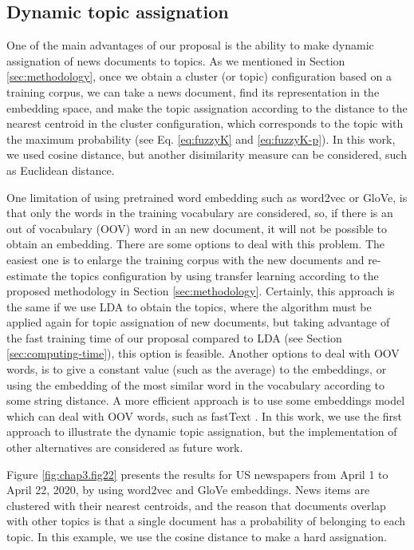 \documentclass{article}
\begin{document}
\subsection{Dynamic topic assignation} 

One of the main advantages of our proposal is the ability to make dynamic assignation of news documents to topics. As we mentioned in Section \ref{sec:methodology}, once we obtain a cluster (or topic) configuration based on a training corpus, we can take a news document, find its representation in the embedding space, and make the topic assignation according to the distance to the nearest centroid in the cluster configuration, which corresponds to the topic with the maximum probability (see Eq. \ref{eq:fuzzyK} and \ref{eq:fuzzyK-p}). In this work, we used cosine distance, but another disimilarity measure can be considered, such as Euclidean distance. 

One limitation of using pretrained word embedding such as word2vec or GloVe, is that only the words in the training vocabulary are considered, so, if there is an out of vocabulary (OOV) word in an new document, it will not be possible to obtain an embedding. There are some options to deal with this problem. The easiest one is to enlarge the training corpus with the new documents and re-estimate the topics configuration by using transfer learning according to the proposed methodology in Section \ref{sec:methodology}. Certainly, this approach is the same if we use LDA to obtain the topics, where the algorithm must be applied again for topic assignation of new documents, but taking advantage of the fast training time of our proposal compared to LDA (see Section \ref{sec:computing-time}), this option is feasible. Another options to deal with OOV words, is to give a constant value (such as the average) to the embeddings, or using the embedding of the most similar word in the vocabulary according to some string distance. A more efficient approach is to use some embeddings model which can deal with OOV words, such as fastText \citep{fasttext_bojanowski-etal-2017}. In this work, we use the first approach to illustrate the dynamic topic assignation, but the implementation of other alternatives are considered as future work. 

Figure \ref{fig:chap3.fig22} presents the results for US newspapers from April 1 to April 22, 2020, by using word2vec and GloVe embeddings. News items are clustered with their nearest centroids, and the reason that documents overlap with other topics is that a single document has a probability of belonging to each topic. In this example, we use the cosine distance to make a hard assignation. 
\end{document}
